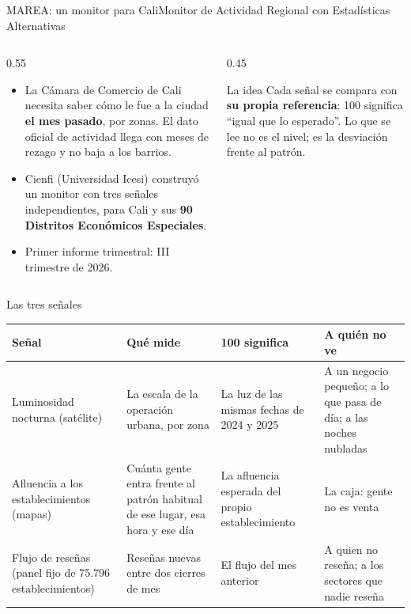 \documentclass{beamer}
\begin{document}
\begin{frame}{MAREA: un monitor para Cali}{Monitor de Actividad Regional con Estadísticas Alternativas}
\begin{columns}[T]
\begin{column}{0.55\textwidth}
\begin{itemize}\itemsep5pt
  \item La Cámara de Comercio de Cali necesita saber cómo le fue a la ciudad \textbf{el mes pasado}, por zonas. El dato oficial de actividad llega con meses de rezago y no baja a los barrios.
  \item Cienfi (Universidad Icesi) construyó un monitor con tres señales independientes, para Cali y sus \textbf{90 Distritos Económicos Especiales}.
  \item Primer informe trimestral: III trimestre de 2026.
\end{itemize}
\end{column}
\begin{column}{0.45\textwidth}
\begin{block}{La idea}
Cada señal se compara con \textbf{su propia referencia}: 100 significa ``igual que lo esperado''. Lo que se lee no es el nivel; es la desviación frente al patrón.
\end{block}
\end{column}
\end{columns}
\end{frame}

\begin{frame}{Las tres señales}
\footnotesize
\begin{tabular}{@{}p{} p{} p{} p{}@{}}
\toprule
Señal & Qué mide & 100 significa & A quién no ve \\
\midrule
Luminosidad nocturna (satélite) & La escala de la operación urbana, por zona & La luz de las mismas fechas de 2024 y 2025 & A un negocio pequeño; a lo que pasa de día; a las noches nubladas \\
Afluencia a los establecimientos (mapas) & Cuánta gente entra frente al patrón habitual de ese lugar, esa hora y ese día & La afluencia esperada del propio establecimiento & La caja: gente no es venta \\
Flujo de reseñas (panel fijo de 75.796 establecimientos) & Reseñas nuevas entre dos cierres de mes & El flujo del mes anterior & A quien no reseña; a los sectores que nadie reseña \\
\bottomrule
\end{tabular}
\end{frame}
\end{document}
